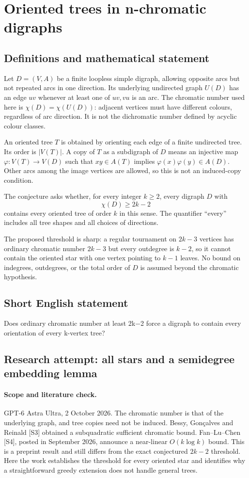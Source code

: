 \documentclass[11pt,a4paper]{article}
\begin{document}
\section*{Oriented trees in n-chromatic digraphs}\label{statement}

\subsection{Definitions and mathematical statement}
Let $D=(V,A)$ be a finite loopless simple digraph, allowing opposite arcs
but not repeated arcs in one direction. Its underlying undirected graph
$U(D)$ has an edge $uv$ whenever at least one of $uv,vu$ is an arc.
The chromatic number used here is $\chi(D)=\chi(U(D))$: adjacent vertices
must have different colours, regardless of arc direction. It is not
the dichromatic number defined by acyclic colour classes.

An oriented tree $T$ is obtained by orienting each edge of a finite
undirected tree. Its order is $|V(T)|$. A copy of $T$ as a subdigraph of
$D$ means an injective map $\varphi:V(T)\to V(D)$ such that
$xy\in A(T)$ implies $\varphi(x)\varphi(y)\in A(D)$. Other arcs among
the image vertices are allowed, so this is not an induced-copy condition.

The conjecture asks whether, for every integer $k\ge2$, every digraph
$D$ with
\[
                            \chi(D)\ge2k-2
\]
contains every oriented tree of order $k$ in this sense. The quantifier
``every'' includes all tree shapes and all choices of directions.

The proposed threshold is sharp: a regular tournament on $2k-3$ vertices
has ordinary chromatic number $2k-3$ but every outdegree is $k-2$, so it
cannot contain the oriented star with one vertex pointing to $k-1$
leaves. No bound on indegrees, outdegrees, or the total order of $D$
is assumed beyond the chromatic hypothesis.
\subsection{Short English statement}
Does ordinary chromatic number at least 2k−2 force a digraph to contain every orientation of every k-vertex tree?
\subsection{Research attempt: all stars and a semidegree embedding lemma}
\paragraph{Scope and literature check.}
GPT-6 Astra Ultra, 2 October 2026. The chromatic number is that of the
underlying graph, and tree copies need not be induced. Bessy,
Gon\c calves and Reinald [S3] obtained a subquadratic sufficient
chromatic bound. Fan--Lu--Chen [S4], posted in September 2026, announce
a near-linear $O(k\log k)$ bound. This is a preprint result and still
differs from the exact conjectured $2k-2$ threshold. Here the work
establishes the threshold for every oriented star and identifies why
a straightforward greedy extension does not handle general trees.
\end{document}
